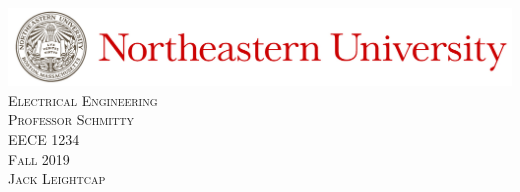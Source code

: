 \documentclass{article}
\newcommand\course{EECE 1234}
\newcommand\coursetitle{Electrical Engineering}
\newcommand\prof{Schmitty}
\newcommand\semester{Fall 2019}
\newcommand\name{Jack Leightcap}
\begin{document}
\begin{titlepage}
	\centering
	\includegraphics[width=\textwidth]{./Images/Header.jpeg}\\
	\vspace*{\fill}
	\textsc{\LARGE{\coursetitle}}\\[0.3cm]
	\textsc{\Large{Professor \prof}}\\[0.3cm]
	\textsc{\large{\course}}\\[0.3cm]
	\textsc{\large{\semester}}\\
	\vspace*{\fill}
	\textsc{\name}
\end{titlepage}
\thispagestyle{empty} 
\tableofcontents
\pagebreak
\setcounter{page}{1}
\pagestyle{fancy}
\end{document}
